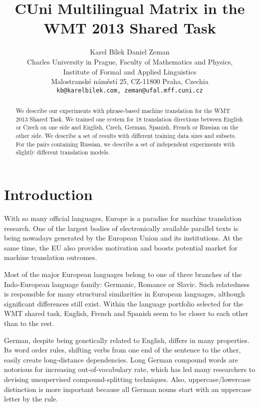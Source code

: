 \documentclass[11pt,letterpaper]{article}
\title{CUni Multilingual Matrix in the WMT 2013 Shared Task}
\author{Karel Bílek \hspace{3cm} Daniel Zeman\\
	Charles University in Prague, Faculty of Mathematics and Physics, \\
	Institute of Formal and Applied Linguistics\\
            Malostranské náměstí 25, CZ-11800 Praha, Czechia \\
	{\tt kb@karelbilek.com, zeman@ufal.mff.cuni.cz}\\
}
\date{}
\newcommand{\todo}[1]{\textcolor{red}{[TODO: {#1}]}} %
\begin{document}
	\maketitle
	\begin{abstract}
We describe our experiments with phrase-based machine translation for the WMT 2013 Shared Task.
We trained one system for 18 translation directions between English or Czech on one side
and English, Czech, German, Spanish, French or Russian on the other side.
We describe a set of results with different training data sizes and subsets. For the pairs containing Russian, we describe a set of independent experiments with slightly different translation models.
	\end{abstract}


\begin{comment} %
\section{Osnova}
\todo{
\begin{itemize}
\item Quotation marks; our heuristics, official normalization, we do not want it primary for human evaluation
\end{itemize}
}
\end{comment}



\section{Introduction}
\label{sec:intro}

With so many official languages, Europe is a paradise for machine translation research.
One of the largest bodies of electronically available parallel texts is being nowadays generated by the European Union and its institutions.
At the same time, the EU also provides motivation and boosts potential market for machine translation outcomes.

Most of the major European languages belong to one of three branches of the Indo-European language family: Germanic, Romance or Slavic.
Such relatedness is responsible for many structural similarities in European languages, although significant differences still exist.
Within the language portfolio selected for the WMT shared task, English, French and Spanish seem to be closer to each other than to the rest.

German, despite being genetically related to English, differs in many properties.
Its word order rules, shifting verbs from one end of the sentence to the other, easily create long-distance dependencies.
Long German compound words are notorious for increasing out-of-vocabulary rate, which has led many researchers to devising unsupervised compound-splitting techniques.
Also, uppercase/lowercase distinction is more important because all German nouns start with an uppercase letter by the rule.
\end{document}
